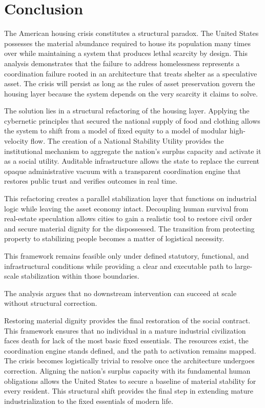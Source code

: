 \documentclass[12pt, letterpaper]{article}
\begin{document}
\section{Conclusion}

The American housing crisis constitutes a structural paradox. The United States possesses the material abundance required to house its population many times over while maintaining a system that produces lethal scarcity by design. This analysis demonstrates that the failure to address homelessness represents a coordination failure rooted in an architecture that treats shelter as a speculative asset. The crisis will persist as long as the rules of asset preservation govern the housing layer because the system depends on the very scarcity it claims to solve.

The solution lies in a structural refactoring of the housing layer. Applying the cybernetic principles that secured the national supply of food and clothing allows the system to shift from a model of fixed equity to a model of modular high-velocity flow. The creation of a National Stability Utility provides the institutional mechanism to aggregate the nation's surplus capacity and activate it as a social utility. Auditable infrastructure allows the state to replace the current opaque administrative vacuum with a transparent coordination engine that restores public trust and verifies outcomes in real time.

This refactoring creates a parallel stabilization layer that functions on industrial logic while leaving the asset economy intact. Decoupling human survival from real-estate speculation allows cities to gain a realistic tool to restore civil order and secure material dignity for the dispossessed. The transition from protecting property to stabilizing people becomes a matter of logistical necessity.

This framework remains feasible only under defined statutory, functional, and infrastructural conditions while providing a clear and executable path to large-scale stabilization within those boundaries.

The analysis argues that no downstream intervention can succeed at scale without structural correction.

Restoring material dignity provides the final restoration of the social contract. This framework ensures that no individual in a mature industrial civilization faces death for lack of the most basic fixed essentials. The resources exist, the coordination engine stands defined, and the path to activation remains mapped. The crisis becomes logistically trivial to resolve once the architecture undergoes correction. Aligning the nation's surplus capacity with its fundamental human obligations allows the United States to secure a baseline of material stability for every resident. This structural shift provides the final step in extending mature industrialization to the fixed essentials of modern life.

\newpage
{}

\nocite{*}

\end{document}
